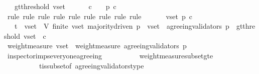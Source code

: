 \begin{isabellebody}
\ \ {\isasymlongrightarrow}\ gt{\isacharunderscore}threshold\ {\isacharparenleft}v{\isacharunderscore}set{\isacharcomma}\ {\isasymsigma}{\isacharparenright}\ \isanewline
\ \ {\isasymlongrightarrow}\ {\isacharparenleft}{\isasymforall}\ c\ {\isasymin}\ {\isasymepsilon}\ {\isasymsigma}{\isachardot}\ p\ c{\isacharparenright}{\isachardoublequoteclose}\isanewline
%
\isadelimproof
\ \ %
\endisadelimproof
%
\isatagproof
{}\isamarkupfalse%
\ {\isacharparenleft}rule{\isacharcomma}\ rule{\isacharcomma}\ rule{\isacharcomma}\ rule{\isacharcomma}\ rule{\isacharcomma}\ rule{\isacharcomma}\ rule{\isacharcomma}\ rule{\isacharcomma}\ rule{\isacharparenright}\isanewline
{}\isamarkupfalse%
\ {\isacharminus}\isanewline
\ \ \isamarkupfalse%
\ {\isasymsigma}\ v{\isacharunderscore}set\ p\ c\isanewline
\ \ \isamarkupfalse%
\ {\isachardoublequoteopen}{\isasymsigma}\ {\isasymin}\ {\isasymSigma}t\ {\isasymand}\ v{\isacharunderscore}set\ {\isasymsubseteq}\ V{\isachardoublequoteclose}\ {\isachardoublequoteopen}finite\ v{\isacharunderscore}set{\isachardoublequoteclose}\ {\isachardoublequoteopen}majority{\isacharunderscore}driven\ p{\isachardoublequoteclose}\ \ {\isachardoublequoteopen}v{\isacharunderscore}set\ {\isasymsubseteq}\ agreeing{\isacharunderscore}validators\ {\isacharparenleft}p{\isacharcomma}\ {\isasymsigma}{\isacharparenright}{\isachardoublequoteclose}\ {\isachardoublequoteopen}gt{\isacharunderscore}threshold\ {\isacharparenleft}v{\isacharunderscore}set{\isacharcomma}\ {\isasymsigma}{\isacharparenright}{\isachardoublequoteclose}\ {\isachardoublequoteopen}c\ {\isasymin}\ {\isasymepsilon}\ {\isasymsigma}{\isachardoublequoteclose}\isanewline
\ \ \isamarkupfalse%
\ \isamarkupfalse%
\ {\isachardoublequoteopen}weight{\isacharunderscore}measure\ v{\isacharunderscore}set\ {\isasymle}\ weight{\isacharunderscore}measure\ {\isacharparenleft}agreeing{\isacharunderscore}validators\ {\isacharparenleft}p{\isacharcomma}\ {\isasymsigma}{\isacharparenright}{\isacharparenright}{\isachardoublequoteclose}\isanewline
\ \ \ \ \isamarkupfalse%
\ inspector{\isacharunderscore}imps{\isacharunderscore}everyone{\isacharunderscore}agreeing\isanewline
\ \ \ \ \ \ \ \ \ \ weight{\isacharunderscore}measure{\isacharunderscore}subset{\isacharunderscore}gte\isanewline
\ \ \ \ \ \ \ \ \ \ {\isasymSigma}t{\isacharunderscore}is{\isacharunderscore}subset{\isacharunderscore}of{\isacharunderscore}{\isasymSigma}\ agreeing{\isacharunderscore}validators{\isacharunderscore}type\ \isamarkupfalse%

\end{isabellebody}
